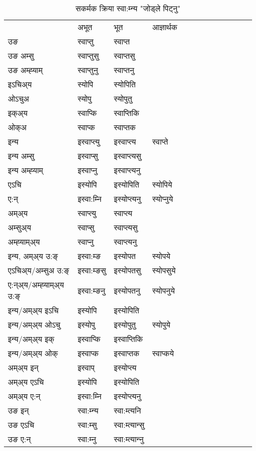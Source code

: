 \begin{table}[H]
\centering
\caption{\label{opt.vt} सकर्मक क्रिया  स्वा:म्‍न्य  "जोड्ले पिट्नु"  }
\begin{tabular}{l|l|l|l|l|l|l|l|l|l|l|l|l}  \toprule
&अभूत & भूत & आज्ञार्थक \\ 
उङ &स्वाप्‍तु &स्वाप्‍त \\ 
उङ अम्सु&स्वाप्‍तुसु &स्वाप्‍तसु \\ 
उङ अम्ह्‍याम्&स्वाप्‍तुनु &स्वाप्‍तनु \\ 
इऽचिअ्य &स्योपि &स्योपिति   \\ 
ओऽचुअ        &स्योपु &स्योपुतु   \\ 
इक्अ्य&स्वाप्कि &स्वाप्‍तिकि   \\ 
ओक्अ &स्वाप्क &स्वाप्‍तक   \\ 
इन्य & इस्वाप्‍त्यु  & इस्वाप्‍त्य &स्वाप्‍ते  \\ 
इन्य अम्सु& इस्वाप्सु  & इस्वाप्‍त्यसु   \\ 
इन्य अम्ह्‍याम्& इस्वाप्‍नु  & इस्वाप्‍त्यनु   \\ 
एऽचि & इस्योपि & इस्योपिति &स्योपिये    \\ 
ए:न् & इस्वा:म्‍नि  & इस्योप्‍त्यनु &स्योप्‍नुये  \\ 
अम्अ्य & स्वाप्‍त्यु  & स्वाप्‍त्य  \\ 
अम्सुअ्य & स्वाप्सु & स्वाप्‍त्यसु  \\ 
अम्ह्‍याम्अ्य & स्वाप्‍नु  & स्वाप्‍त्यनु \\ 
\midrule
इन्य, अम्अ्य उ:ङ्‌ &इस्वा:म्ङ &इस्योपत &स्योपये \\ 
एऽचिअ्य/अम्सुअ उ:ङ्‌ &इस्वा:म्ङसु &इस्योपतसु &स्योपसुये \\ 
ए:न्अ्य/अम्ह्‍याम्अ्य उ:ङ्‌ &इस्वा:म्ङनु &इस्योपतनु &स्योपनुये \\ 
इन्य/अम्अ्य इऽचि &इस्योपि &इस्योपिति    \\ 
इन्य/अम्अ्य ओऽचु &इस्योपु &इस्योपुतु  &स्योपुये  \\ 
इन्य/अम्अ्य इक् &इस्वाप्कि &इस्वाप्‍तिकि   \\ 
इन्य/अम्अ्य ओक् &इस्वाप्क &इस्वाप्‍तक  &स्वाप्कये  \\ 
अम्अ्य इन् & इस्वाप् & इस्योप्‍त्य   \\ 
अम्अ्य एऽचि & इस्योपि & इस्योपिति    \\ 
अम्अ्य ए:न् & इस्वा:म्‍नि  & इस्योप्‍त्यनु  \\ 
\midrule
उङ इन् & स्वा:म्‍न्य  & स्वा:म्त्यनि  \\ 
उङ एऽचि & स्वा:म्सु  & स्वा:म्त्यान्सु   \\ 
उङ ए:न्& स्वा:म्‍नु  & स्वा:म्त्यान्‍नु   \\ 
\bottomrule
\end{tabular}
\end{table}


